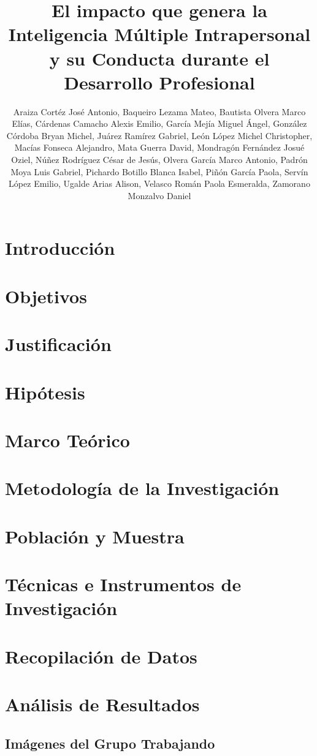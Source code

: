 \documentclass[stu,12pt]{apa7}
\affiliation{Facultad de Inform\'atica, Universidad Aut\'onoma de Quer\'etaro}
\title{El impacto que genera la Inteligencia M\'ultiple Intrapersonal y su
Conducta durante el Desarrollo Profesional}
\author{Araiza Cort\'ez Jos\'e Antonio, Baqueiro Lezama Mateo, Bautista Olvera
Marco El\'ias, C\'ardenas Camacho Alexis Emilio, Garc\'ia Mej\'ia Miguel
\'Angel, Gonz\'alez C\'ordoba Bryan Michel, Ju\'arez Ram\'irez Gabriel, Le\'on
L\'opez Michel Christopher, Mac\'ias Fonseca Alejandro, Mata Guerra David, 
Mondrag\'on Fern\'andez Josu\'e Oziel, N\'u\~nez Rodr\'iguez C\'esar de Jes\'us,
Olvera Garc\'ia Marco Antonio, Padr\'on Moya Luis Gabriel, Pichardo Botillo
Blanca Isabel, Pi\~n\'on Garc\'ia Paola, Serv\'in L\'opez Emilio, Ugalde Arias
Alison, Velasco Rom\'an Paola Esmeralda, Zamorano Monzalvo Daniel}
\begin{document}
\maketitle
\tableofcontents
\listoffigures
\listoftables
\section{Introducci\'on}


\section{Objetivos}

\section{Justificaci\'on}

\section{Hip\'otesis}

\section{Marco Te\'orico}

\section{Metodolog\'ia de la Investigaci\'on}

\section{Poblaci\'on y Muestra}

\section{T\'ecnicas e Instrumentos de Investigaci\'on}

\section{Recopilaci\'on de Datos}
%
\section{An\'alisis de Resultados}


\begin{appendix}
\section{Im\'agenes del Grupo Trabajando}

\end{appendix}
\printbibliography
\end{document}
